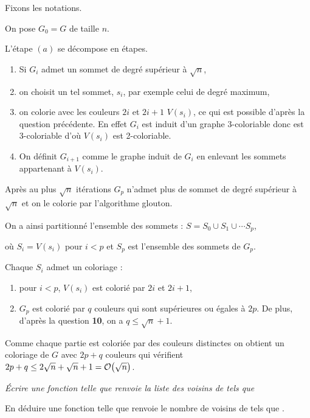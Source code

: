 \begin{Answer}
Fixons les notations.

On pose $G_0=G$ de taille $n$.

L'étape $(a)$ se décompose en étapes.
\begin{enumerate}[noitemsep]
    \item Si $G_i$ admet un sommet de degré supérieur à $\sqrt n$,
    \item on choisit un tel sommet, $s_i$, par exemple celui de degré maximum,
    \item on colorie avec les couleurs $2i$ et $2i+1$ $V(s_i)$, ce qui est possible d'après la question précédente. En effet $G_i$ est induit d'un graphe 3-coloriable donc est 3-coloriable d'où $V(s_i)$ est 2-coloriable.
    \item On définit $G_{i+1}$ comme le graphe induit de $G_i$ en enlevant les sommets appartenant à $V(s_i)$.
\end{enumerate}
Après au plus $\sqrt n$ itérations $G_p$ n'admet plus de sommet de degré supérieur à $\sqrt n$ et on le colorie par l'algorithme glouton.

On a ainsi partitionné l'ensemble des sommets : $S = S_0\cup S_1\cup\cdots S_p$,

où $S_i=V(s_i)$ pour $i<p$ et $S_p$ est l'ensemble des sommets de $G_p$.

Chaque $S_i$ admet un coloriage : 
\begin{enumerate}[noitemsep]
    \item pour $i<p$,  $V(s_i)$ est colorié par $2i$ et $2i+1$,
    \item $G_p$ est colorié par $q$ couleurs qui sont supérieures ou égales à $2p$. De plus, d'après la question {\bf 10}, on a $q\le\sqrt n+1$.
\end{enumerate}
Comme chaque partie est coloriée par des couleurs distinctes on obtient un coloriage de $G$ avec $2p+q$ couleurs qui vérifient $2p+q \le 2\sqrt n + \sqrt n +1 = {\cal O}\bigl(\sqrt n\bigr)$.
\end{Answer}
\begin{Exercise}\it 
Écrire une fonction  telle que  renvoie la liste des voisins  de  tels que 

En déduire une fonction  telle que  renvoie le nombre de voisins  de  tels que . 
\end{Exercise} 
